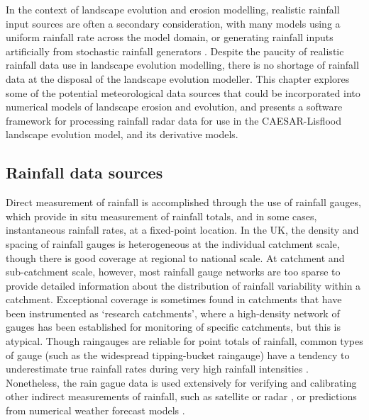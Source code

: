 In the context of landscape evolution and erosion modelling, realistic rainfall input sources are often a secondary consideration, with many models using a uniform rainfall rate across the model domain, or generating rainfall inputs artificially from stochastic rainfall generators \citep[Chapter \ref{chapter_RainfallInLEMs},][]{Tucker2000}. Despite the paucity of realistic rainfall data use in landscape evolution modelling, there is no shortage of rainfall data at the disposal of the landscape evolution modeller. This chapter explores some of the potential meteorological data sources that could be incorporated into numerical models of landscape erosion and evolution, and presents a software framework for processing rainfall radar data for use in the CAESAR-Lisflood landscape evolution model, and its derivative models.

\subsection{Rainfall data sources}
Direct measurement of rainfall is accomplished through the use of rainfall gauges, which provide in situ measurement of rainfall totals, and in some cases, instantaneous rainfall rates, at a fixed-point location. In the UK, the density and spacing of rainfall gauges is heterogeneous at the individual catchment scale, though there is good coverage at regional to national scale. At catchment and sub-catchment scale, however, most rainfall gauge networks are too sparse to provide detailed information about the distribution of rainfall variability within a catchment. Exceptional coverage is sometimes found in catchments that have been instrumented as `research catchments', where a high-density network of gauges has been established for monitoring of specific catchments, \citep[e.g. the Plynlimon research catchment,][]{newson1979results} but this is atypical. Though raingauges are reliable for point totals of rainfall, common types of gauge (such as the widespread tipping-bucket raingauge) have a tendency to underestimate true rainfall rates during very high rainfall intensities \citep{habib2001sampling,ciach2003local}. Nonetheless, the rain gague data is used extensively for verifying and calibrating other indirect measurements of rainfall, such as satellite or radar \citep{harrison2000improving,ebert2007methods}, or predictions from numerical weather forecast models \citep{golding2000quantitative}.

